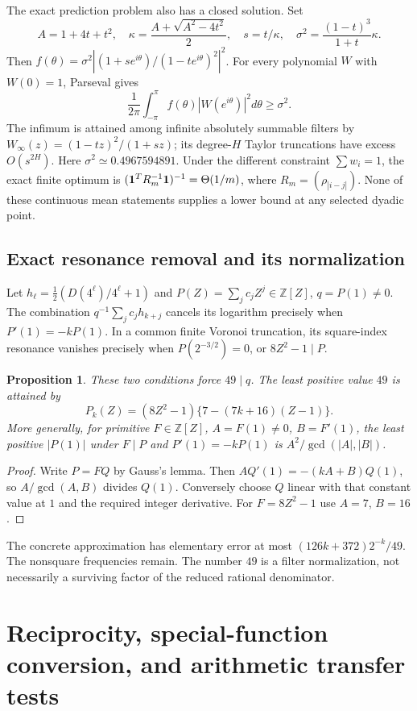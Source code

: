 \documentclass[11pt,a4paper]{article}
\newcommand{\Z}{\mathbb Z}
\newtheorem{proposition}[theorem]{Proposition}
\theoremstyle{definition}
\theoremstyle{remark}
\numberwithin{equation}{section}
\begin{document}
The exact prediction problem also has a closed solution.  Set
\[
 A=1+4t+t^2,\quad \kappa=\frac{A+\sqrt{A^2-4t^2}}2,
 \quad s=t/\kappa,\quad \sigma^2=\frac{(1-t)^3}{1+t}\kappa.
\]
Then $f(\theta)=\sigma^2|(1+se^{i\theta})/(1-te^{i\theta})^2|^2$.
For every polynomial $W$ with $W(0)=1$, Parseval gives
\[
 \frac1{2\pi}\int_{-\pi}^{\pi}f(\theta)|W(e^{i\theta})|^2d\theta
 \ge\sigma^2.
\]
The infimum is attained among infinite absolutely summable filters by
$W_\infty(z)=(1-tz)^2/(1+sz)$; its degree-$H$ Taylor truncations have
excess $O(s^{2H})$.  Here $\sigma^2\simeq0.4967594891$.
Under the different constraint $\sum w_i=1$, the exact finite optimum is
$({\bf1}^TR_m^{-1}{\bf1})^{-1}=\Theta(1/m)$, where
$R_m=(\rho_{|i-j|})$.  None of these continuous mean statements supplies
a lower bound at any selected dyadic point.

\subsection{Exact resonance removal and its normalization}
Let $h_\ell=\tfrac12(D(4^\ell)/4^\ell+1)$ and
$P(Z)=\sum_jc_jZ^j\in\Z[Z]$, $q=P(1)\ne0$.
The combination $q^{-1}\sum_jc_jh_{k+j}$ cancels its logarithm precisely
when $P'(1)=-kP(1)$.  In a common finite Voronoi truncation, its square-index
resonance vanishes precisely when $P(2^{-3/2})=0$, or
$8Z^2-1\mid P$.
\begin{proposition}\label{ar:resonance}
These two conditions force $49\mid q$.  The least positive value $49$ is
attained by
\[
 P_k(Z)=(8Z^2-1)\{7-(7k+16)(Z-1)\}.
\]
More generally, for primitive $F\in\Z[Z]$, $A=F(1)\ne0$,
$B=F'(1)$, the least positive $|P(1)|$ under $F\mid P$ and
$P'(1)=-kP(1)$ is $A^2/\gcd(|A|,|B|)$.
\end{proposition}
\begin{proof}
Write $P=FQ$ by Gauss's lemma.  Then
$AQ'(1)=-(kA+B)Q(1)$, so $A/\gcd(A,B)$ divides $Q(1)$.
Conversely choose $Q$ linear with that constant value at $1$ and the
required integer derivative.  For $F=8Z^2-1$ use $A=7$, $B=16$.
\end{proof}
The concrete approximation has elementary error at most
$(126k+372)2^{-k}/49$.  The nonsquare frequencies remain.  The number
$49$ is a filter normalization, not necessarily a surviving factor of the
reduced rational denominator.

\section{Reciprocity, special-function conversion, and arithmetic transfer tests}
\label{ar:reciprocity}
\end{document}
